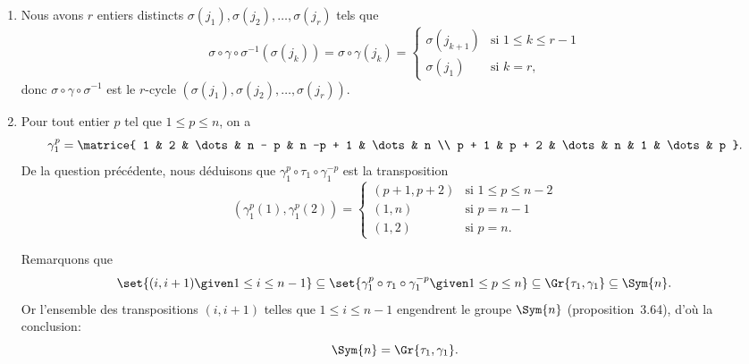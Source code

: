 \begin{enumerate}
  \item
    Nous avons $r$ entiers distincts $\sigma(j_1), \sigma(j_2), \dots, \sigma(j_r)$ tels que
    \[
      \sigma\circ\gamma\circ\sigma^{-1} (\sigma(j_k))
        = \sigma\circ\gamma(j_k)
        = \begin{cases}
            \sigma(j_{k + 1})  & \text{si $1\leq k \leq r - 1$} \\
            \sigma(j_1) & \text{si $k = r$},
          \end{cases}
    \]
    donc $\sigma\circ\gamma\circ\sigma^{-1}$ est le $r$-cycle $(\sigma(j_1), \sigma(j_2), \dots, \sigma(j_r))$.

  \item
    Pour tout entier $p$ tel que $1\leq p\leq n$, on a
    \[
      \gamma_1^p =
        \matrice{
          1 & 2 & \dots & n - p & n -p + 1 & \dots & n \\
          p + 1 & p + 2 & \dots & n & 1 & \dots & p
        }.
    \]
    De la question précédente, nous déduisons que $\gamma_1^p\circ\tau_1\circ\gamma_1^{-p}$ est la transposition
    \[
        (\gamma_1^p(1), \gamma_1^p(2))
        = \begin{cases}
            (p + 1, p + 2) & \text{si $1\leq p\leq n - 2$} \\
            (1, n) & \text{si $p = n - 1$} \\
            (1, 2) & \text{si $p = n$}.
          \end{cases}
    \]

    Remarquons que
    \[
      \set{(i, i + 1)\given 1\leq i\leq n - 1}\subseteq\set{\gamma_1^p\circ\tau_1\circ\gamma_1^{-p}\given 1\leq p\leq n} \subseteq \Gr{\tau_1, \gamma_1}\subseteq\Sym{n}.
    \]
    Or l'ensemble des transpositions $(i, i + 1)$ telles que $1\leq i\leq n - 1$ engendrent le groupe $\Sym{n}$ (proposition~3.64), d'où la conclusion:
    \[
      \Sym{n} = \Gr{\tau_1, \gamma_1}.
    \]
\end{enumerate}
